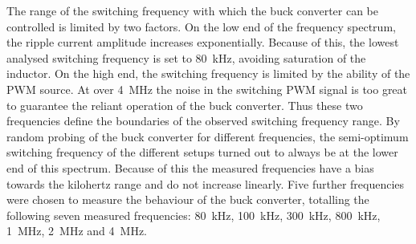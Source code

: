 The range of the switching frequency with which the buck converter can be controlled is limited by two factors. On the low end of the frequency spectrum, the ripple current amplitude increases exponentially. Because of this, the lowest analysed switching frequency is set to \SI{80}{\kilo\Hz}, avoiding saturation of the inductor. On the high end, the switching frequency is limited by the ability of the \ac{PWM} source. At over \SI{4}{\mega\Hz} the noise in the switching \ac{PWM} signal is too great to guarantee the reliant operation of the buck converter. Thus these two frequencies define the boundaries of the observed switching frequency range. By random probing of the buck converter for different frequencies, the semi-optimum switching frequency of the different setups turned out to always be at the lower end of this spectrum. Because of this the measured frequencies have a bias towards the kilohertz range and do not increase linearly. Five further frequencies were chosen to measure the behaviour of the buck converter, totalling the following seven measured frequencies: \SI{80}{\kilo\Hz}, \SI{100}{\kilo\Hz}, \SI{300}{\kilo\Hz}, \SI{800}{\kilo\Hz}, \SI{1}{\mega\Hz}, \SI{2}{\mega\Hz} and \SI{4}{\mega\Hz}.

